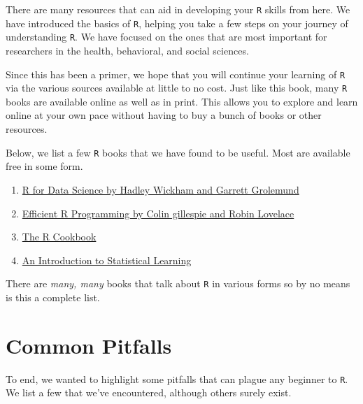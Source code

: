 \documentclass[]{tufte-book}
\providecommand{\tightlist}{%
  \setlength{\itemsep}{0pt}\setlength{\parskip}{0pt}}
\theoremstyle{definition}
\theoremstyle{definition}
\theoremstyle{remark}
\begin{document}
There are many resources that can aid in developing your \texttt{R}
skills from here. We have introduced the basics of \texttt{R}, helping
you take a few steps on your journey of understanding \texttt{R}. We
have focused on the ones that are most important for researchers in the
health, behavioral, and social sciences.

Since this has been a primer, we hope that you will continue your
learning of \texttt{R} via the various sources available at little to no
cost. Just like this book, many \texttt{R} books are available online as
well as in print. This allows you to explore and learn online at your
own pace without having to buy a bunch of books or other resources.

Below, we list a few \texttt{R} books that we have found to be useful.
Most are available free in some form.

\begin{enumerate}
\def\labelenumi{\arabic{enumi}.}
\tightlist
\item
  \href{http://r4ds.had.co.nz/}{R for Data Science by Hadley Wickham and
  Garrett Grolemund}
\item
  \href{https://csgillespie.github.io/efficientR/}{Efficient R
  Programming by Colin gillespie and Robin Lovelace}
\item
  \href{http://www.cookbook-r.com/}{The R Cookbook}
\item
  \href{http://www-bcf.usc.edu/~gareth/ISL/}{An Introduction to
  Statistical Learning}
\end{enumerate}

There are \emph{many, many} books that talk about \texttt{R} in various
forms so by no means is this a complete list.

\section*{Common Pitfalls}\label{common-pitfalls}

To end, we wanted to highlight some pitfalls that can plague any
beginner to \texttt{R}. We list a few that we've encountered, although
others surely exist.
\end{document}
